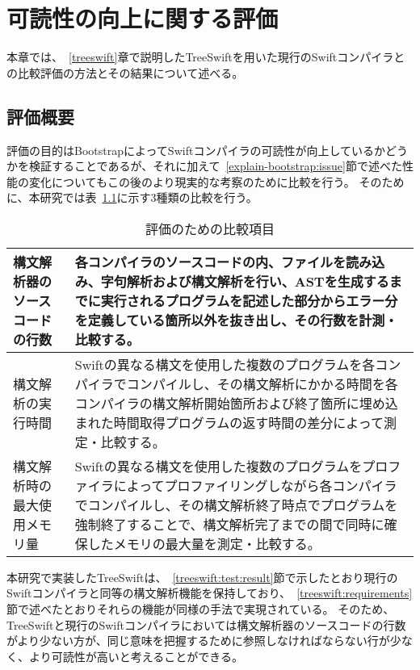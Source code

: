 \chapter{可読性の向上に関する評価}
\label{readability-evaluation}

本章では、~\ref{treeswift}章で説明したTreeSwiftを用いた現行のSwiftコンパイラとの比較評価の方法とその結果について述べる。


\section{評価概要}

評価の目的はBootstrapによってSwiftコンパイラの可読性が向上しているかどうかを検証することであるが、それに加えて~\ref{explain-bootstrap:issue}節で述べた性能の変化についてもこの後のより現実的な考察のために比較を行う。
そのために、本研究では表~\ref{table:evaluation-items}に示す3種類の比較を行う。

\begin{table}[hb]
    \begin{center}
        \caption{評価のための比較項目}
        \begin{tabular}{|m{4cm}|m{11cm}|}
            \hline
            構文解析器のソースコードの行数 & 各コンパイラのソースコードの内、ファイルを読み込み、字句解析および構文解析を行い、ASTを生成するまでに実行されるプログラムを記述した部分からエラー分を定義している箇所以外を抜き出し、その行数を計測・比較する。 \\
            \hline
            構文解析の実行時間 & Swiftの異なる構文を使用した複数のプログラムを各コンパイラでコンパイルし、その構文解析にかかる時間を各コンパイラの構文解析開始箇所および終了箇所に埋め込まれた時間取得プログラムの返す時間の差分によって測定・比較する。 \\
            \hline
            構文解析時の最大使用メモリ量 & Swiftの異なる構文を使用した複数のプログラムをプロファイラによってプロファイリングしながら各コンパイラでコンパイルし、その構文解析終了時点でプログラムを強制終了することで、構文解析完了までの間で同時に確保したメモリの最大量を測定・比較する。 \\
            \hline
        \end{tabular}
        \label{table:evaluation-items}
    \end{center}
\end{table}

本研究で実装したTreeSwiftは、~\ref{treeswift:test:result}節で示したとおり現行のSwiftコンパイラと同等の構文解析機能を保持しており、~\ref{treeswift:requirements}節で述べたとおりそれらの機能が同様の手法で実現されている。
そのため、TreeSwiftと現行のSwiftコンパイラにおいては構文解析器のソースコードの行数がより少ない方が、同じ意味を把握するために参照しなければならない行が少なく、より可読性が高いと考えることができる。


